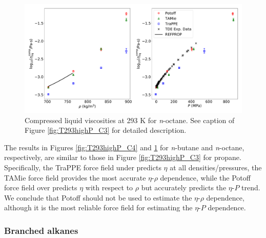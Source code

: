 \documentclass[preprint,review,12pt]{elsarticle}
\begin{document}
	\begin{figure}[htb!]
		\centering
		\includegraphics[width=6.4in]{compare_REFPROP_T293highP_C8H18.pdf}
		\caption{Compressed liquid viscosities at 293 K for \textit{n}-octane. See caption of Figure \ref{fig:T293highP_C3} for detailed description.}
		\label{fig:T293highP_C8}
	\end{figure} 
	
	The results in Figures \ref{fig:T293highP_C4} and \ref{fig:T293highP_C8} for \textit{n}-butane and \textit{n}-octane, respectively, are similar to those in Figure \ref{fig:T293highP_C3} for propane. Specifically, the TraPPE force field under predicts $\eta$ at all densities/pressures, the TAMie force field provides the most accurate $\eta$-$\rho$ dependence, while the Potoff force field over predicts $\eta$ with respect to $\rho$ but accurately predicts the $\eta$-$P$ trend. We conclude that Potoff should not be used to estimate the $\eta$-$\rho$ dependence, although it is the most reliable force field for estimating the $\eta$-$P$ dependence.
	
	
	\subsubsection{Branched alkanes}
	
	
	
\end{document}
